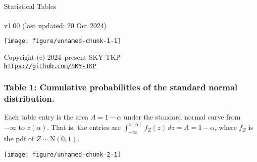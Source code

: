 \documentclass[
]{article}
\author{}
\date{\vspace{-2.5em}}
\begin{document}
\thispagestyle{empty}
\begin{center}
~\\
\vspace{2cm}
{\Huge Statistical Tables}
~\\~\\
v1.00 (last updated: 20 Oct 2024)
\vspace{5cm}
\end{center}

\begin{center}\texttt{[image: figure/unnamed-chunk-1-1]} \end{center}

\vfill
\begin{center}
Copyright (c) 2024--present SKY-TKP
~\\
\href{https://github.com/SKY-TKP}{\texttt{https://github.com/SKY-TKP}}
\end{center}

\newpage

\subsubsection{Table 1: Cumulative probabilities of the standard normal
distribution.}\label{table-1-cumulative-probabilities-of-the-standard-normal-distribution.}

Each table entry is the area \(A=1-\alpha\) under the standard normal
curve from \(-\infty\) to \(z(\alpha)\). That is, the entries are
\(\int_{-\infty}^{z(\alpha)}f_Z(z) \, dz = A = 1-\alpha\), where \(f_Z\)
is the pdf of \(Z\sim \text{N}(0,1)\).

\vspace{1em}

\begin{center}\texttt{[image: figure/unnamed-chunk-2-1]} \end{center}
\end{document}
